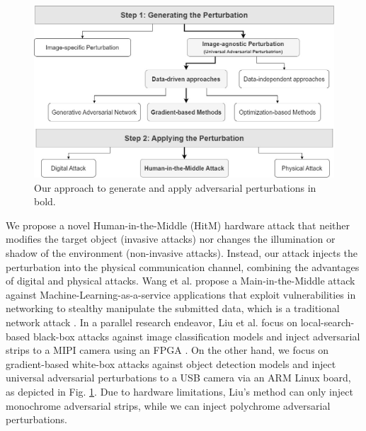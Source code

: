 

\begin{figure}[bt]
    \centering
    \includegraphics[width=0.9\linewidth]{figures/chapter_detection/hardware/attack.jpg}
    \caption{Our approach to generate and apply adversarial perturbations in bold.}
    \label{fig:attack}
\end{figure}

We propose a novel Human-in-the-Middle (HitM)  hardware attack that neither modifies the target object (invasive attacks) nor changes the illumination or shadow of the environment (non-invasive attacks). Instead, our attack injects the perturbation into the physical communication channel, combining the advantages of digital and physical attacks. Wang et al. propose a Main-in-the-Middle attack against Machine-Learning-as-a-service applications that exploit vulnerabilities in networking to stealthy manipulate the submitted data, which is a traditional network attack \citep{wang2020man}. In a parallel research endeavor, Liu et al. focus on local-search-based black-box attacks against image classification models and inject adversarial strips to a MIPI camera using an FPGA \citep{liu2022practical}. On the other hand, we focus on gradient-based white-box attacks against object detection models and inject universal adversarial perturbations to a USB camera via an ARM Linux board, as depicted in Fig. \ref{fig:attack}. Due to hardware limitations, Liu's method can only inject monochrome adversarial strips, while we can inject polychrome adversarial perturbations. 


